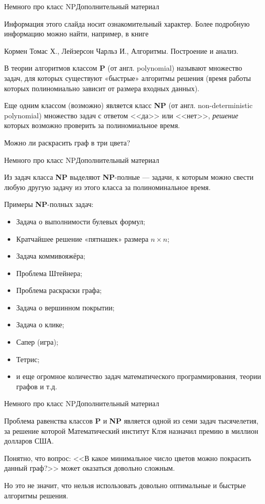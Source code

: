\begin{frame}{Немного про класс NP}{Дополнительный материал}

Информация этого слайда носит ознакомительный характер. Более подробную информацию можно найти, например, в книге

Кормен Томас Х., Лейзерсон Чарльз И., Алгоритмы. Построение и анализ. 

 В теории алгоритмов классом $\textbf{P}$ (от англ. polynomial) называют множество задач, для которых существуют «быстрые» алгоритмы решения (время работы которых полиномиально зависит от размера входных данных).

 Еще одним классом (возможно) является класс {\bf NP} (от англ. non-deterministic polynomial) множество задач с ответом <<да>> или <<нет>>, {\it решение} которых возможно проверить за полиномиальное время.

\exmpl Можно ли раскрасить граф в три цвета?

\end{frame}


\begin{frame}{Немного про класс NP}{Дополнительный материал}

Из задач класса {\bf NP} выделяют {\bf NP}-полные --- задачи, к которым можно свести любую другую задачу из этого класса за полиноминальное время.



Примеры {\bf NP}-полных задач:

\begin{itemize}
\item Задача о выполнимости булевых формул;
\item Кратчайшее решение «пятнашек» размера $n\times n$;
\item Задача коммивояжёра;
\item Проблема Штейнера;
\item Проблема раскраски графа;
\item Задача о вершинном покрытии;
\item Задача о клике;
\item Сапер (игра);
\item Тетрис;
\item и еще огромное количество задач математического программирования, теории графов и т.д.
\end{itemize}

\end{frame}


\begin{frame}{Немного про класс NP}{Дополнительный материал}

Проблема равенства классов {\bf P} и {\bf NP} является одной из семи задач тысячелетия, за решение которой Математический институт Клэя назначил премию в миллион долларов США.

\spc
Понятно, что вопрос: <<В какое минимальное число цветов можно покрасить данный граф?>> может оказаться довольно сложным.

\spc
Но это не значит, что нельзя использовать довольно оптимальные и быстрые алгоритмы решения.

\end{frame}

